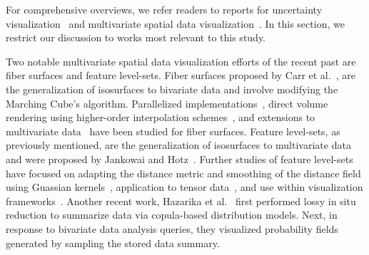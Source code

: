 %
For comprehensive overviews, we refer readers to reports for uncertainty visualization~\cite{Bonneau2014,johnson2003next,potter2011quantification} and multivariate spatial data visualization~\cite{he2019multivariate}.
%
In this section, we restrict our discussion to works most relevant to this study.

Two notable multivariate spatial data visualization efforts of the recent past are fiber surfaces and feature level-sets.
%
Fiber surfaces proposed by Carr et al.~\cite{carr2015fiber}, are the generalization of isosurfaces to bivariate data and involve modifying the Marching Cube's algorithm.
%
Parallelized implementations~\cite{klacansky2016fast}, direct volume rendering using higher-order interpolation schemes~\cite{wu2016direct}, and extensions to multivariate data~\cite{blecha2020fiber} have been studied for fiber surfaces.  
%
Feature level-sets, as previously mentioned, are the generalization of isosurfaces to multivariate data and were proposed by Jankowai and Hotz~\cite{jankowai2020feature}.
%
Further studies of feature level-sets have focused on adapting the distance metric and smoothing of the distance field using Guassian kernels~\cite{nguyen2020visualization}, application to tensor data~\cite{jankowai2020tensor}, and use within visualization frameworks~\cite{jonsson2020inviwo}.
%
%
Another recent work, Hazarika et al.~\cite{hazarika2018codda} first performed lossy in situ reduction to summarize data via copula-based distribution models. 
%
Next, in response to bivariate data analysis queries, they visualized probability fields generated by sampling the stored data summary. 
%

%


